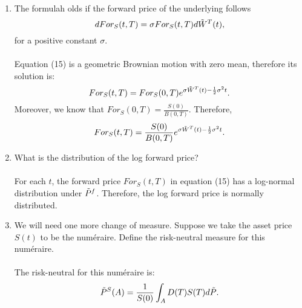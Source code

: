 \documentclass[11pt,a4,table]{article}
\begin{document}
\begin{enumerate}
    \begin{enumerate}
        \item The formulah olds if the forward price of the underlying follows
        \begin{equation}
            dFor_S(t,T) = \sigma For_S(t,T) d\Tilde{W}^T(t),
        \end{equation}
        for a positive constant $\sigma$.\\\\
        Equation (15) is a geometric Brownian motion with zero mean, therefore its solution is:
        \begin{equation*}
            For_S(t,T) = For_S(0,T)e^{\sigma\Tilde{W}^T(t) - \frac{1}{2}\sigma^2t}.
        \end{equation*}
        Moreover, we know that $For_S(0,T) = \frac{S(0)}{B(0,T)}$. Therefore,
        \begin{equation}
            For_S(t,T) = \frac{S(0)}{B(0,T)}e^{\sigma\Tilde{W}^T(t) - \frac{1}{2}\sigma^2t}.
        \end{equation}
        
        
        \item What is the distribution of the log forward price?\\\\
        For each $t$, the forward price $For_S(t,T)$ in equation (15) has a log-normal distribution under $\Tilde{P}^f$. Therefore, the log forward price is normally distributed.
        
        \item We will need one more change of measure. Suppose we take the asset price $S(t)$ to be the numéraire. Define the risk-neutral measure for this numéraire.\\\\
        The risk-neutral for this numéraire is:
        \begin{equation}
            \Tilde{P}^S(A) = \frac{1}{S(0)}\int_A D(T)S(T) d\Tilde{P}.
        \end{equation}
        

\end{enumerate}
\end{enumerate}
\end{document}
